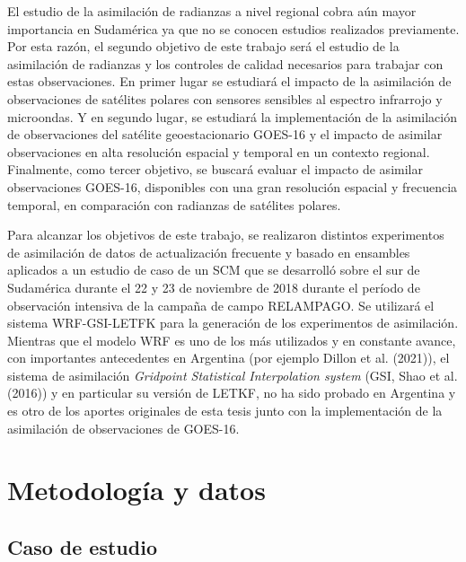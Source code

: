 \documentclass[12pt,oneside,a4paper]{reedthesis}
\begin{document}
El estudio de la asimilación de radianzas a nivel regional cobra aún mayor importancia en Sudamérica ya que no se conocen estudios realizados previamente. Por esta razón, el segundo objetivo de este trabajo será el estudio de la asimilación de radianzas y los controles de calidad necesarios para trabajar con estas observaciones. En primer lugar se estudiará el impacto de la asimilación de observaciones de satélites polares con sensores sensibles al espectro infrarrojo y microondas. Y en segundo lugar, se estudiará la implementación de la asimilación de observaciones del satélite geoestacionario GOES-16 y el impacto de asimilar observaciones en alta resolución espacial y temporal en un contexto regional. Finalmente, como tercer objetivo, se buscará evaluar el impacto de asimilar observaciones GOES-16, disponibles con una gran resolución espacial y frecuencia temporal, en comparación con radianzas de satélites polares.

Para alcanzar los objetivos de este trabajo, se realizaron distintos experimentos de asimilación de datos de actualización frecuente y basado en ensambles aplicados a un estudio de caso de un SCM que se desarrolló sobre el sur de Sudamérica durante el 22 y 23 de noviembre de 2018 durante el período de observación intensiva de la campaña de campo RELAMPAGO. Se utilizará el sistema WRF-GSI-LETFK para la generación de los experimentos de asimilación. Mientras que el modelo WRF es uno de los más utilizados y en constante avance, con importantes antecedentes en Argentina (por ejemplo Dillon et al. (2021)), el sistema de asimilación \emph{Gridpoint Statistical Interpolation system} (GSI, Shao et al. (2016)) y en particular su versión de LETKF, no ha sido probado en Argentina y es otro de los aportes originales de esta tesis junto con la implementación de la asimilación de observaciones de GOES-16.

\hypertarget{metodologuxeda-y-datos}{%
\chapter{Metodología y datos}\label{metodologuxeda-y-datos}}

\hypertarget{caso-de-estudio}{%
\section{Caso de estudio}\label{caso-de-estudio}}
\end{document}
